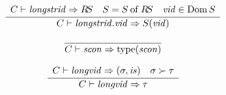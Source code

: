\begin{equation}	%
\frac{\begin{array}{lcr}
      \C\ts\longstrid\ra\RS & 
      \S = \of\S\RS&
      \vid\in\Dom\S
      \end{array}
      }
     {\C\ts\dotlongid{\longstrid}{\vid}\ra\S(\vid)}
\end{equation}





%

\begin{equation}	%
\label{sconexp-rule}
\frac{}
     {\C\ts\scon\ra\scontype(\scon)}\index{26.3}
\end{equation}


\begin{equation}	%
  \label{longvidexp-rule}
   \frac{\begin{array}{lr}
        \C\ts\longvid\ra(\tych,\is) &
        \tych\succ\tau
        \end{array}}
       {\C\ts\longvid\ra\tau}
\end{equation}

